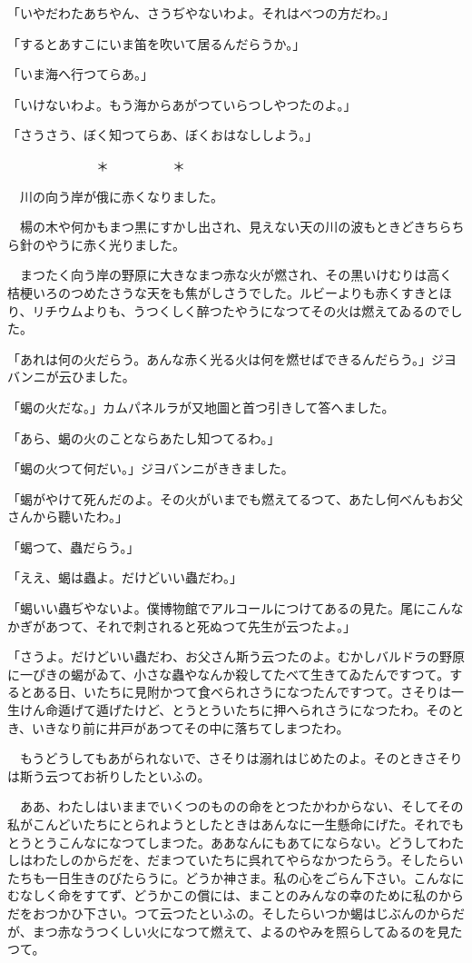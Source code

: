\documentclass[tate,paper=b6j,jafontsize=9pt]{jlreq}
\begin{document}
「いやだわたあちやん、さうぢやないわよ。それはべつの方だわ。」

「するとあすこにいま笛を吹いて居るんだらうか。」

「いま海へ行つてらあ。」

「いけないわよ。もう海からあがつていらつしやつたのよ。」

「さうさう、ぼく知つてらあ、ぼくおはなししよう。」

　　　　　　　＊　　　　　＊

　川の向う岸が俄に赤くなりました。

　楊の木や何かもまつ黒にすかし出され、見えない天の川の波もときどきちらちら針のやうに赤く光りました。

　まつたく向う岸の野原に大きなまつ赤な火が燃され、その黒いけむりは高く桔梗いろのつめたさうな天をも焦がしさうでした。ルビーよりも赤くすきとほり、リチウムよりも、うつくしく醉つたやうになつてその火は燃えてゐるのでした。

「あれは何の火だらう。あんな赤く光る火は何を燃せばできるんだらう。」ジヨバンニが云ひました。

「蝎の火だな。」カムパネルラが又地圖と首つ引きして答へました。

「あら、蝎の火のことならあたし知つてるわ。」

「蝎の火つて何だい。」ジヨバンニがききました。

「蝎がやけて死んだのよ。その火がいまでも燃えてるつて、あたし何べんもお父さんから聽いたわ。」

「蝎つて、蟲だらう。」

「ええ、蝎は蟲よ。だけどいい蟲だわ。」

「蝎いい蟲ぢやないよ。僕博物館でアルコールにつけてあるの見た。尾にこんなかぎがあつて、それで刺されると死ぬつて先生が云つたよ。」

「さうよ。だけどいい蟲だわ、お父さん斯う云つたのよ。むかしバルドラの野原に一ぴきの蝎がゐて、小さな蟲やなんか殺してたべて生きてゐたんですつて。するとある日、いたちに見附かつて食べられさうになつたんですつて。さそりは一生けん命遁げて遁げたけど、とうとういたちに押へられさうになつたわ。そのとき、いきなり前に井戸があつてその中に落ちてしまつたわ。

　もうどうしてもあがられないで、さそりは溺れはじめたのよ。そのときさそりは斯う云つてお祈りしたといふの。

　ああ、わたしはいままでいくつのものの命をとつたかわからない、そしてその私がこんどいたちにとられようとしたときはあんなに一生懸命にげた。それでもとうとうこんなになつてしまつた。ああなんにもあてにならない。どうしてわたしはわたしのからだを、だまつていたちに呉れてやらなかつたらう。そしたらいたちも一日生きのびたらうに。どうか神さま。私の心をごらん下さい。こんなにむなしく命をすてず、どうかこの償には、まことのみんなの幸のために私のからだをおつかひ下さい。つて云つたといふの。そしたらいつか蝎はじぶんのからだが、まつ赤なうつくしい火になつて燃えて、よるのやみを照らしてゐるのを見たつて。
\end{document}

